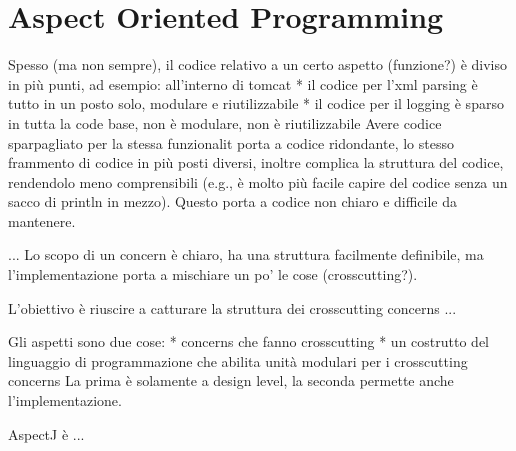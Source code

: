 \section{Aspect Oriented Programming}

Spesso (ma non sempre), il codice relativo a un certo aspetto (funzione?) è diviso in più punti, ad esempio: all'interno di tomcat
* il codice per l'xml parsing è tutto in un posto solo, modulare e riutilizzabile
* il codice per il logging è sparso in tutta la code base, non è modulare, non è riutilizzabile
Avere codice sparpagliato per la stessa funzionalit porta a codice ridondante, lo stesso frammento di codice in più posti diversi, inoltre complica la struttura del codice, rendendolo meno comprensibili (e.g., è molto più facile capire del codice senza un sacco di println in mezzo).
Questo porta a codice non chiaro e difficile da mantenere.

...
Lo scopo di un concern è chiaro, ha una struttura facilmente definibile, ma l'implementazione porta a mischiare un po' le cose (crosscutting?).

L'obiettivo è riuscire a catturare la struttura dei crosscutting concerns ...

Gli aspetti sono due cose:
* concerns che fanno crosscutting
* un costrutto del linguaggio di programmazione che abilita unità modulari per i crosscutting concerns
La prima è solamente a design level, la seconda permette anche l'implementazione.

AspectJ è ...

